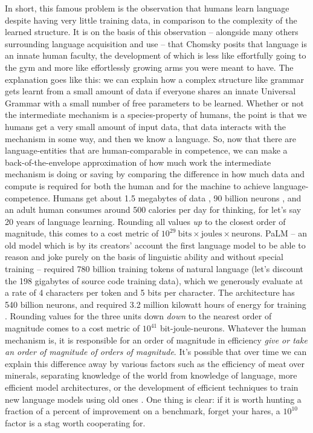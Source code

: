  In short, this famous problem is the observation that humans learn language despite having very little training data, in comparison to the complexity of the learned structure. It is on the basis of this observation -- alongside many others surrounding language acquisition and use -- that Chomsky posits \citep{chomsky_new_2000} that language is an innate human faculty, the development of which is less like effortfully going to the gym and more like effortlessly growing arms you were meant to have. The explanation goes like this: we can explain how a complex structure like grammar gets learnt from a small amount of data if everyone shares an innate Universal Grammar with a small number of free parameters to be learned. Whether or not the intermediate mechanism is a species-property of humans, the point is that we humans get a very small amount of input data, that data interacts with the mechanism in some way, and then we know a language. So, now that there are language-entities that are human-comparable in competence, we can make a back-of-the-envelope approximation of how much work the intermediate mechanism is doing or saving by comparing the difference in how much data and compute is required for both the human and for the machine to achieve language-competence. Humans get about 1.5 megabytes of data \citep{mollica_humans_2019}, 90 billion neurons \citep{herculano-houzel_remarkable_2012}, and an adult human consumes around 500 calories per day for thinking, for let's say 20 years of language learning. Rounding all values \emph{up} to the closest order of magnitude, this comes to a cost metric of $10^{29} \ \text{bits} \times \text{joules} \times \text{neurons}$. PaLM -- an old model which is by its creators' account the first language model to be able to reason and joke purely on the basis of linguistic ability and without special training \citep{chowdhery_palm_2022,narang_pathways_2022} -- required 780 billion training tokens of natural language (let's discount the 198 gigabytes of source code training data), which we generously evaluate at a rate of 4 characters per token \citep{khan_what_2023} and 5 bits per character. The architecture has 540 billion neurons, and required 3.2 million kilowatt hours of energy for training \citep{tom_goldstein_tomgoldsteincs_training_2022}. Rounding values for the three units down \emph{down} to the nearest order of magnitude comes to a cost metric of $10^{41}$ bit-joule-neurons. Whatever the human mechanism is, it is responsible for an order of magnitude in efficiency \emph{give or take an order of magnitude of orders of magnitude}. It's possible that over time we can explain this difference away by various factors such as the efficiency of meat over minerals, separating knowledge of the world from knowledge of language, more efficient model architectures, or the development of efficient techniques to train new language models using old ones \citep{taori_rohan_stanford_2023}. One thing is clear: if it is worth hunting a fraction of a percent of improvement on a benchmark, forget your hares, a $10^{10}$ factor is a stag worth cooperating for.

